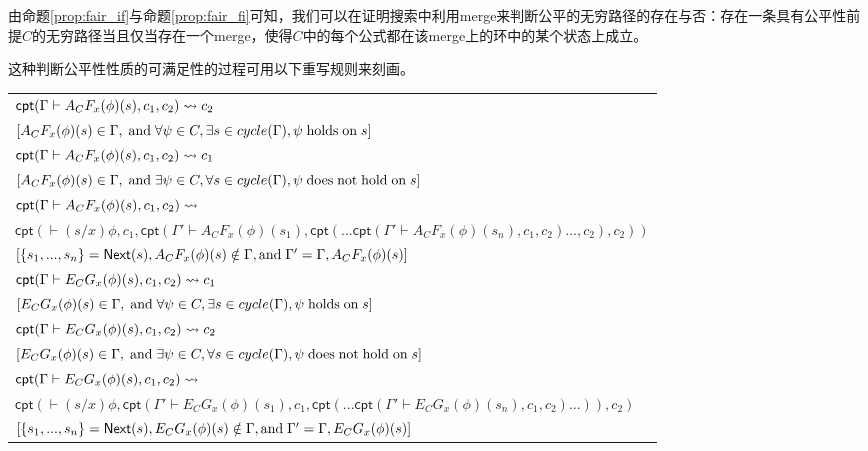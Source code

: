由命题\ref{prop:fair_if}与命题\ref{prop:fair_fi}可知，我们可以在证明搜索中利用merge来判断公平的无穷路径的存在与否：存在一条具有公平性前提$C$的无穷路径当且仅当存在一个merge，使得$C$中的每个公式都在该merge上的环中的某个状态上成立。

这种判断公平性性质的可满足性的过程可用以下重写规则来刻画。

\begin{center}
	\footnotesize
	\begin{tabular}{|ll|}
		
		\hline
		\multicolumn{2}{|l|}{$\textsf{cpt}(\Gamma\vdash A_CF_x(\phi)(s), c_1, c_2)\rightsquigarrow c_2 ~~~ $}\\ 
		\multicolumn{2}{|l|}{$\left[A_CF_x(\phi)(s)\in \Gamma,\; \textup{and}\; \forall \psi\in C,\exists s\in cycle(\Gamma),\psi\; \textup{holds}\; \textup{on}\; s\right]~~~~~~$}\\
		\hline
		\multicolumn{2}{|l|}{$\textsf{cpt}(\Gamma\vdash A_CF_x(\phi)(s), c_1, c_2)\rightsquigarrow c_1 ~~~ $}\\ 
		\multicolumn{2}{|l|}{$\left[A_CF_x(\phi)(s)\in \Gamma,\; \textup{and}\; \exists \psi\in C,\forall s\in cycle(\Gamma),\psi\; \textup{does}\;\textup{not}\; \textup{hold}\; \textup{on}\; s\right]~~~~~~$}\\
		\hline
		\multicolumn{2}{|l|}{$\textsf{cpt}(\Gamma\vdash A_CF_x(\phi)(s), c_1, c_2)\rightsquigarrow$}\\
		\multicolumn{2}{|l|}{$\textsf{cpt}(\vdash(s/x)\phi, c_1, \textsf{cpt}(\Gamma'\vdash A_CF_x(\phi)(s_1), \textsf{cpt}(...\textsf{cpt}(\Gamma'\vdash A_CF_x(\phi)(s_n), c_1, c_2)..., c_2), c_2))$}\\
		\multicolumn{2}{|l|}{$\left[\{s_1,...,s_n\}=\textsf{Next}(s), A_CF_x(\phi)(s)\notin \Gamma, \textup{and}\; \Gamma'=\Gamma,A_CF_x(\phi)(s)\right]$}\\ 
		\hline
		\multicolumn{2}{|l|}{$\textsf{cpt}(\Gamma\vdash E_CG_x(\phi)(s), c_1, c_2)\rightsquigarrow c_1 ~~~ $}\\ 
		\multicolumn{2}{|l|}{$\left[E_CG_x(\phi)(s)\in \Gamma,\; \textup{and}\; \forall \psi\in C,\exists s\in cycle(\Gamma),\psi\; \textup{holds}\; \textup{on}\; s\right]~~~~~~$}\\
		\hline
		\multicolumn{2}{|l|}{$\textsf{cpt}(\Gamma\vdash E_CG_x(\phi)(s), c_1, c_2)\rightsquigarrow c_2 ~~~ $}\\ 
		\multicolumn{2}{|l|}{$\left[E_CG_x(\phi)(s)\in \Gamma,\; \textup{and}\; \exists \psi\in C,\forall s\in cycle(\Gamma),\psi\; \textup{does}\;\textup{not}\; \textup{hold}\; \textup{on}\; s\right]~~~~~~$}\\
		\hline
		\multicolumn{2}{|l|}{$\textsf{cpt}(\Gamma\vdash E_CG_x(\phi)(s), c_1, c_2)\rightsquigarrow$}\\
		\multicolumn{2}{|l|}{$\textsf{cpt}(\vdash(s/x)\phi, \textsf{cpt}(\Gamma'\vdash E_CG_x(\phi)(s_1), c_1, \textsf{cpt}(...\textsf{cpt}(\Gamma'\vdash E_CG_x(\phi)(s_n), c_1, c_2)...)), c_2)$}\\
		\multicolumn{2}{|l|}{$\left[\{s_1,...,s_n\}=\textsf{Next}(s), E_CG_x(\phi)(s)\notin \Gamma, \textup{and}\; \Gamma'=\Gamma, E_CG_x(\phi)(s)\right]$}\\ 
		\hline
		

\end{tabular}
\end{center}
